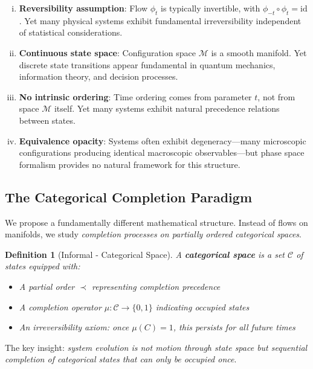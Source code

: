 \documentclass[12pt,a4paper]{article}
\newtheorem{definition}[theorem]{Definition}
\begin{document}
\begin{enumerate}[(i)]
\item \textbf{Reversibility assumption}: Flow $\phi_t$ is typically invertible, with $\phi_{-t} \circ \phi_t = \text{id}$. Yet many physical systems exhibit fundamental irreversibility independent of statistical considerations.

\item \textbf{Continuous state space}: Configuration space $\mathcal{M}$ is a smooth manifold. Yet discrete state transitions appear fundamental in quantum mechanics, information theory, and decision processes.

\item \textbf{No intrinsic ordering}: Time ordering comes from parameter $t$, not from space $\mathcal{M}$ itself. Yet many systems exhibit natural precedence relations between states.

\item \textbf{Equivalence opacity}: Systems often exhibit degeneracy—many microscopic configurations producing identical macroscopic observables—but phase space formalism provides no natural framework for this structure.
\end{enumerate}

\subsection{The Categorical Completion Paradigm}

We propose a fundamentally different mathematical structure. Instead of flows on manifolds, we study \textit{completion processes on partially ordered categorical spaces}.

\begin{definition}[Informal - Categorical Space]
A \textbf{categorical space} is a set $\mathcal{C}$ of states equipped with:
\begin{itemize}
\item A partial order $\prec$ representing completion precedence
\item A completion operator $\mu: \mathcal{C} \to \{0, 1\}$ indicating occupied states
\item An irreversibility axiom: once $\mu(C) = 1$, this persists for all future times
\end{itemize}
\end{definition}

The key insight: \textit{system evolution is not motion through state space but sequential completion of categorical states that can only be occupied once}.
\end{document}
